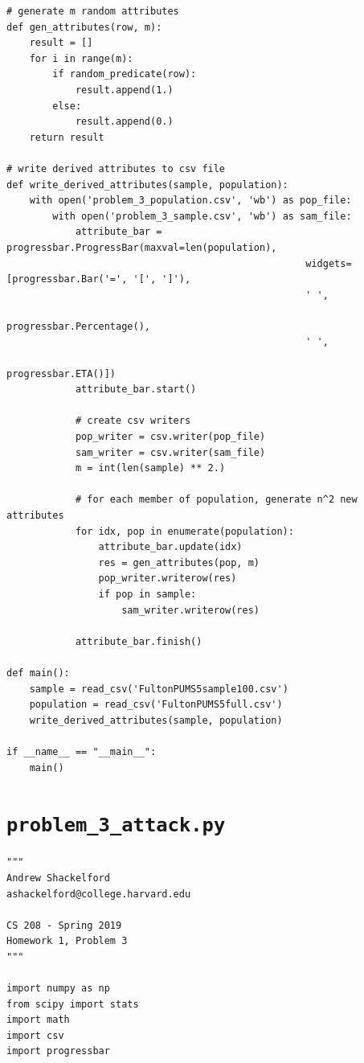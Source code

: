 \documentclass[12pt]{article}
\def\cl{\lstinline}
\begin{document}
\begin{appendices}
\begin{lstlisting}
# generate m random attributes
def gen_attributes(row, m):
    result = []
    for i in range(m):
        if random_predicate(row):
            result.append(1.)
        else:
            result.append(0.)
    return result

# write derived attributes to csv file
def write_derived_attributes(sample, population):
    with open('problem_3_population.csv', 'wb') as pop_file:
        with open('problem_3_sample.csv', 'wb') as sam_file:
            attribute_bar = progressbar.ProgressBar(maxval=len(population),
                                                    widgets=[progressbar.Bar('=', '[', ']'),
                                                    ' ',
                                                    progressbar.Percentage(),
                                                    ' ',
                                                    progressbar.ETA()])
            attribute_bar.start()

            # create csv writers
            pop_writer = csv.writer(pop_file)
            sam_writer = csv.writer(sam_file)
            m = int(len(sample) ** 2.)

            # for each member of population, generate n^2 new attributes
            for idx, pop in enumerate(population):
                attribute_bar.update(idx)
                res = gen_attributes(pop, m)
                pop_writer.writerow(res)
                if pop in sample:
                    sam_writer.writerow(res)

            attribute_bar.finish()

def main():
    sample = read_csv('FultonPUMS5sample100.csv')
    population = read_csv('FultonPUMS5full.csv')
    write_derived_attributes(sample, population)

if __name__ == "__main__":
    main()
\end{lstlisting}

\newpage

\section{\cl{problem_3_attack.py}}
\label{appendix:problem_3_attack}

\begin{lstlisting}
"""
Andrew Shackelford
ashackelford@college.harvard.edu

CS 208 - Spring 2019
Homework 1, Problem 3
"""

import numpy as np
from scipy import stats
import math
import csv
import progressbar


\end{lstlisting}
\end{appendices}
\end{document}
